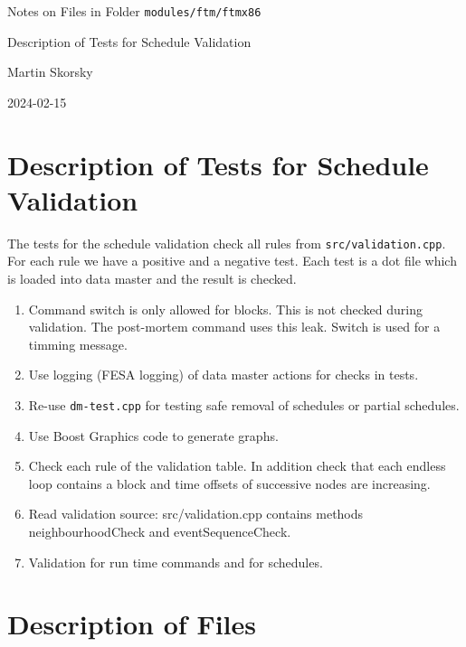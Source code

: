 \documentclass[12pt,a4paper]{report}
\begin{document}
\begin{titlepage}
\vspace{2cm}
\begin{center}
\Huge{Notes on Files in Folder \texttt{modules/ftm/ftmx86}}

\Huge{Description of Tests for Schedule Validation}

\Large{Martin Skorsky}

\Large{2024-02-15}
\end{center}
\vfill
\end{titlepage}

\tableofcontents

\chapter{Description of Tests for Schedule Validation}
The tests for the schedule validation check all rules from \texttt{src/validation.cpp}. For each rule we have a positive and a negative test. Each test is a dot file which is loaded into data master and the result is checked.

\begin{enumerate}
    \item Command switch is only allowed for blocks. This is not checked during validation. The post-mortem command uses this leak. Switch is used for a timming message.
    \item Use logging (FESA logging) of data master actions for checks in tests.
    \item Re-use \texttt{dm-test.cpp} for testing safe removal of schedules or partial schedules.
    \item Use Boost Graphics code to generate graphs.
    \item Check each rule of the validation table. In addition check that each endless loop contains a block and time offsets of successive nodes are increasing.
    \item Read validation source: src/validation.cpp contains methods neighbourhoodCheck and eventSequenceCheck.
    \item Validation for run time commands and for schedules.
\end{enumerate}

\chapter{Description of Files}
\end{document}
